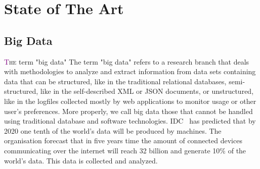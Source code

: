 \chapter{State of The Art} \label{chap:stateOfTheArt}

\section{Big Data}\label{sec:big_data}
\lettrine[lines=4]{\textcolor{purple}{T}}{he} term "big data" The term "big data" refers to a  research branch that deals with methodologies to analyze and extract information from data sets containing data that can be structured, like in the traditional relational databases, semi-structured, like in the self-described XML or JSON documents, or unstructured, like in the logfiles collected mostly by web applications to monitor usage or other user's preferences. More properly, we call big data those that cannot be handled using traditional database and software technologies. 
IDC~\cite{misc:IDC} has predicted that by 2020 one tenth of the world’s data will be produced by machines. The organisation forecast that in five years time the amount of connected devices communicating over the internet will reach 32 billion and generate 10\% of the world’s data.
This data is collected and analyzed. 
